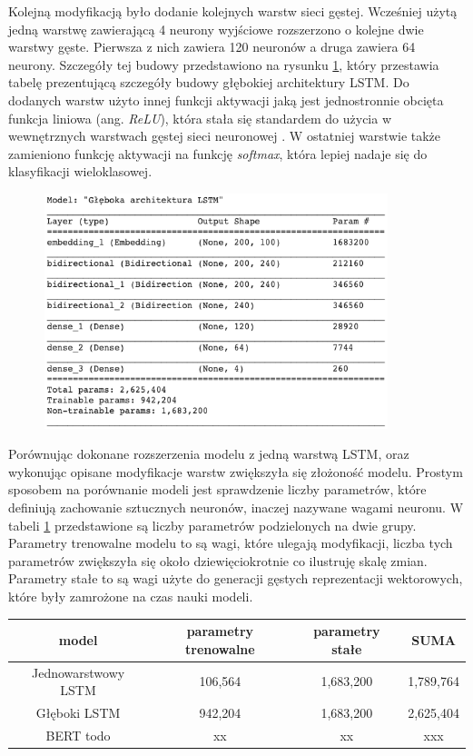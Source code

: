 Kolejną modyfikacją było dodanie kolejnych warstw sieci gęstej. Wcześniej użytą jedną warstwę zawierającą 4 neurony wyjściowe rozszerzono o kolejne dwie warstwy gęste. Pierwsza z nich zawiera 120 neuronów a druga zawiera 64 neurony. Szczegóły tej budowy przedstawiono na rysunku \ref{rys:lstm_deep_table}, który przestawia tabelę prezentującą szczegóły budowy głębokiej architektury LSTM. Do dodanych warstw użyto innej funkcji aktywacji jaką jest jednostronnie obcięta funkcja liniowa (ang. \textit{ReLU}), która stała się standardem do użycia w wewnętrznych warstwach gęstej sieci neuronowej \cite{xu2015empirical}. W ostatniej warstwie także zamieniono funkcję aktywacji na funkcję \textit{softmax}, która lepiej nadaje się do klasyfikacji wieloklasowej.

\begin{figure}[t]
\centering\includegraphics[width=10cm]{figures/reports/lstm_deep_table.png}
\label{rys:lstm_deep_table}
\end{figure}

Porównując dokonane rozszerzenia modelu z jedną warstwą LSTM, oraz wykonując opisane modyfikacje warstw zwiększyła się złożoność modelu. Prostym sposobem na porównanie modeli jest sprawdzenie liczby parametrów, które definiują zachowanie sztucznych neuronów, inaczej nazywane wagami neuronu. W tabeli \ref{tab:tabela_modele} przedstawione są liczby parametrów podzielonych na dwie grupy. Parametry trenowalne modelu to są wagi, które ulegają modyfikacji, liczba tych parametrów zwiększyła się około dziewięciokrotnie co ilustruję skalę zmian. Parametry stałe to są wagi użyte do generacji gęstych reprezentacji wektorowych, które były zamrożone na czas nauki modeli.  

\begin{table}[t]
\label{tab:tabela_modele}
\centering\footnotesize%
\begin{tabular}{c c c c}
\toprule
model & parametry trenowalne & parametry stałe & SUMA \\
\midrule
Jednowarstwowy LSTM   & 106,564 & 1,683,200 & 1,789,764 \\
Głęboki LSTM   & 942,204 & 1,683,200 & 2,625,404 \\
BERT todo   & xx & xx & xxx \\
\bottomrule
\end{tabular}
\end{table}

